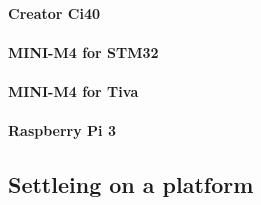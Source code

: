\paragraph{Creator Ci40}
\paragraph{MINI-M4 for STM32}
\paragraph{MINI-M4 for Tiva}
\paragraph{Raspberry Pi 3}

\subsection{Settleing on a platform}


\section{}
